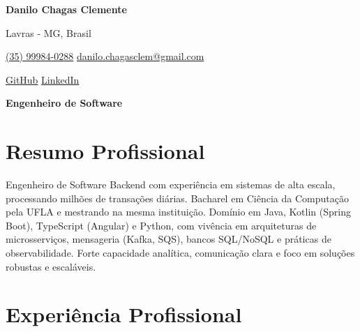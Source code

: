\documentclass[a4paper,10pt]{article}
\begin{document}

\noindent
\begin{minipage}[t]{0.5\textwidth}
\textbf{\Large Danilo Chagas Clemente}

\vspace{0.4em}

\end{minipage}%
\begin{minipage}[t]{0.5\textwidth}
\raggedleft

Lavras - MG, Brasil

{\color{blue}} \href{tel:+5535999840288}{\faPhone \space (35) 99984-0288}
{\color{blue}} \href{mailto:danilo.chagasclem@gmail.com}{\faEnvelope \space danilo.chagasclem@gmail.com}

\vspace{0.2em}
 \quad
{\color{blue}} \href{https://github.com/danilochagasc}{\faGithub \space GitHub} \quad
{\color{blue}} \href{https://www.linkedin.com/in/danilo-clemente-94880a232/}{\faLinkedin \space LinkedIn} \\
\end{minipage}

\vspace{1em}

\noindent\textbf{\Large Engenheiro de Software}
\vspace{0.5em}

\section*{Resumo Profissional}

\vspace{0.6em}

Engenheiro de Software Backend com experiência em sistemas de alta escala, processando milhões de transações diárias. Bacharel em Ciência da Computação pela UFLA e mestrando na mesma instituição. Domínio em Java, Kotlin (Spring Boot), TypeScript (Angular) e Python, com vivência em arquiteturas de microsserviços, mensageria (Kafka, SQS), bancos SQL/NoSQL e práticas de observabilidade. Forte capacidade analítica, comunicação clara e foco em soluções robustas e escaláveis.

\vspace{0.6em}

\section*{Experiência Profissional}

\vspace{0.6em}
\end{document}
